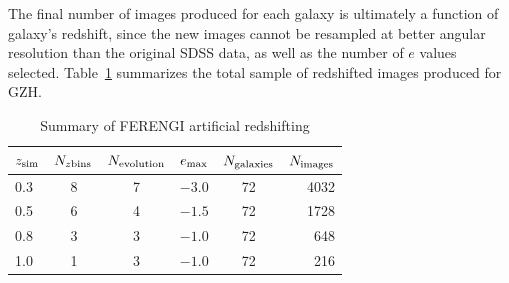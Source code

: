 \documentclass[twocolumn]{aastex6}
\begin{document}
The final number of \ferengi{} images produced for each galaxy is ultimately a function of galaxy's redshift, since the new images cannot be resampled at better angular resolution than the original SDSS data, as well as the number of $e$ values selected. Table~\ref{tbl:ferengivalues} summarizes the total sample of redshifted images produced for GZH. 

\begin{table}
\caption{Summary of FERENGI artificial redshifting \label{tbl:ferengivalues}}
\begin{tabular}{lccccr}
\hline\hline
$z_{\rm sim}$ & $N_{z {\rm bins}}$ & $N_{\rm evolution}$ & $e_{\rm max}$ & $N_{\rm galaxies}$ & $N_{\rm images}$\\
\hline
0.3              & 8                  & 7                   & $-3.0$        & 72             & 4032 \\
0.5              & 6                  & 4                   & $-1.5$        & 72             & 1728 \\
0.8              & 3                  & 3                   & $-1.0$        & 72             &  648 \\
1.0              & 1                  & 3                   & $-1.0$        & 72             &  216 \\
\hline\hline
\end{tabular}
\end{table}
\end{document}
